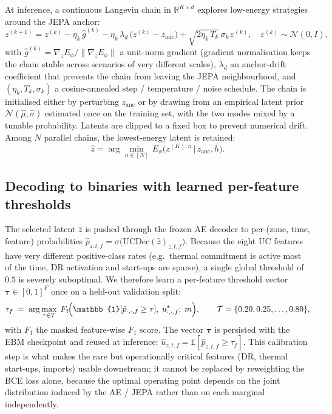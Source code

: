 \documentclass{article}
\begin{document}
At inference, a continuous Langevin chain in $\mathbb{R}^{K\times d}$ explores low-energy strategies around the JEPA anchor:
\begin{equation}
z^{(k+1)} = z^{(k)} - \eta_k\,\hat g^{(k)} - \eta_k\,\lambda_d\,\bigl(z^{(k)} - z_{\mathrm{anc}}\bigr) + \sqrt{2\eta_k\,T_k}\,\sigma_k\,\varepsilon^{(k)}, \quad \varepsilon^{(k)} \sim \mathcal{N}(0, I),
\label{eq:latent_langevin}
\end{equation}
with $\hat g^{(k)} = \nabla_z E_\phi / \|\nabla_z E_\phi\|$ a unit-norm gradient (gradient normalisation keeps the chain stable across scenarios of very different scales), $\lambda_d$ an anchor-drift coefficient that prevents the chain from leaving the JEPA neighbourhood, and $(\eta_k, T_k, \sigma_k)$ a cosine-annealed step / temperature / noise schedule. The chain is initialised either by perturbing $z_{\mathrm{anc}}$ or by drawing from an empirical latent prior $\mathcal{N}(\hat\mu, \hat\sigma)$ estimated once on the training set, with the two modes mixed by a tunable probability. Latents are clipped to a fixed box to prevent numerical drift. Among $N$ parallel chains, the lowest-energy latent is retained:
\begin{equation}
\hat z = \arg\min_{n \in [N]}\, E_\phi\!\bigl(z^{(K), n} \,\big|\, z_{\mathrm{anc}}, \bar h\bigr).
\label{eq:best_of_n}
\end{equation}

\subsection{Decoding to binaries with learned per-feature thresholds}
\label{sec:learned_thresholds}

The selected latent $\hat z$ is pushed through the frozen AE decoder to per-(zone, time, feature) probabilities $\hat p_{z,t,f} = \sigma\!\bigl(\mathrm{UCDec}(\hat z)_{z,t,f}\bigr)$. Because the eight UC features have very different positive-class rates (e.g.\ thermal commitment is active most of the time, DR activation and start-ups are sparse), a single global threshold of $0.5$ is severely suboptimal. We therefore learn a per-feature threshold vector $\boldsymbol\tau \in [0,1]^F$ once on a held-out validation split:
\begin{equation}
\tau_f \;=\; \arg\max_{\tau \in \mathcal{T}}\; F_1\!\Bigl(\mathbb{1}[\hat p_{\cdot,\cdot,f} \geq \tau],\; u^\star_{\cdot,\cdot,f};\; m\Bigr),
\qquad
\mathcal{T} = \{0.20, 0.25, \dots, 0.80\},
\label{eq:learned_threshold}
\end{equation}
with $F_1$ the masked feature-wise $F_1$ score. The vector $\boldsymbol\tau$ is persisted with the EBM checkpoint and reused at inference: $\hat u_{z,t,f} = \mathbb{1}[\hat p_{z,t,f} \geq \tau_f]$. This calibration step is what makes the rare but operationally critical features (DR, thermal start-ups, imports) usable downstream; it cannot be replaced by reweighting the BCE loss alone, because the optimal operating point depends on the joint distribution induced by the AE / JEPA rather than on each marginal independently.
\end{document}
